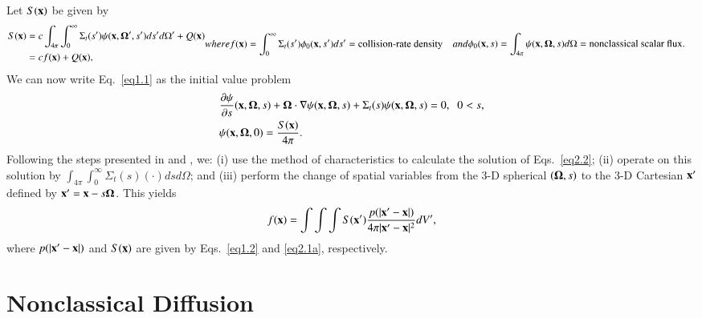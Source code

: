 \documentclass[preprint,12pt]{elsarticle}
\newcommand{\ux}{{\bf x}}
\newcommand{\uomega}{{\bf \Omega}}
\newcommand{\unabla}{{\bf \nabla}}
\begin{document}
Let $S(\ux)$ be given by
\begin{subequations}
\begin{align}\label{eq2.1a}
S(\ux) &= c\int_{4\pi}\int_0^\infty \Sigma_t(s')\psi(\ux,\uomega',s')ds'd\Omega'+Q(\ux) \\
&= cf(\ux) + Q(\ux), \nonumber
\end{align}
where 
\begin{align}
f(\ux) &= \int_0^\infty \Sigma_t(s')\phi_0(\ux,s')ds' = \text{collision-rate density}\label{eq2.1b}
\end{align}
and
\begin{align}
\phi_0(\ux,s) &= \int_{4\pi} \psi(\ux,\uomega,s)d\Omega = \text{nonclassical scalar flux}.\label{eq2.1c}
\end{align}
\end{subequations}
We can now write Eq.\ \eqref{eq1.1} as the initial value problem
\begin{subequations}
\label{eq2.2}
\begin{align}
&\frac{\partial\psi}{\partial s}(\ux,\uomega,s) + \uomega\cdot\unabla\psi(\ux,\uomega,s) + \Sigma_t(s)\psi(\ux,\uomega,s) = 0, \;\; 0 < s ,\\
& \psi(\ux,\uomega,0) = \frac{S(\ux)}{4\pi}.
\end{align}
\end{subequations}
Following the steps presented in \cite{larsen_11} and \cite{siap15}, we: (i) use the method of characteristics to calculate the solution of Eqs.\ \eqref{eq2.2}; (ii) operate on this solution by $\int_{4\pi}\int_0^\infty \Sigma_t(s) (\cdot )dsd\Omega$; and (iii) perform the change of spatial variables from the 3-D spherical $(\uomega,s)$ to the 3-D Cartesian $\ux'$ defined by $\ux'= \ux-s\uomega$. This yields
\begin{equation}
\label{eq2.3}
f(\ux) = \int\int\int S(\ux') \frac{p(|\ux'-\ux|)}{4\pi |\ux'-\ux|^2} dV',
\end{equation}
where $p(|\ux'-\ux|)$ and $S(\ux)$ are given by Eqs.\ \eqref{eq1.2} and \eqref{eq2.1a}, respectively.


\section{Nonclassical Diffusion}\label{sec3}
\setcounter{section}{3}
\setcounter{equation}{0} 
\end{document}
